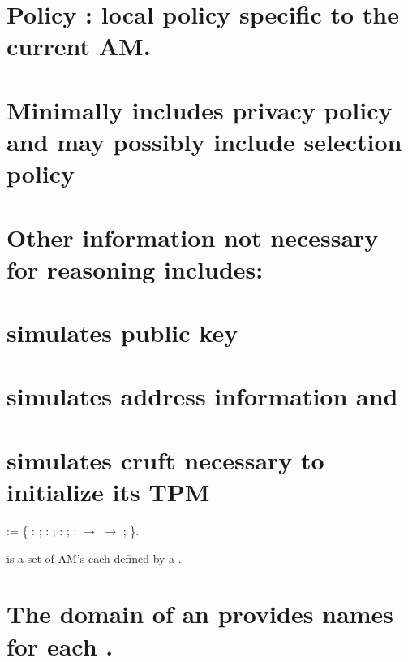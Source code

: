 \documentclass[12pt]{report}
\begin{document}
\section{Policy : local policy specific to the current AM.}


\section{Minimally includes privacy policy and may possibly include selection policy}




\section{Other information not necessary for reasoning includes:}


\section{\texorpdfstring{\protect}{key} simulates public key}


\section{\texorpdfstring{\protect}{address} simulates address information and}


\section{\texorpdfstring{\protect}{tpm} simulates cruft necessary to initialize its TPM}



\begin{coqdoccode}
\coqdocnoindent
{}  := \{\coqdoceol
\coqdocnoindent
\coqdoceol
\coqdocindent{1.50em}
 :   ;\coqdoceol
\coqdocindent{1.50em}
 :   ; \coqdoceol
\coqdocindent{1.50em}
 :   ; \coqdoceol
\coqdocindent{1.50em}
 :  \ensuremath{\rightarrow}  \ensuremath{\rightarrow}  ;\coqdoceol
\coqdocnoindent
\coqdoceol
\coqdocnoindent
\coqdoceol
\coqdocindent{0.50em}
\}.\coqdoceol
\coqdocemptyline
\end{coqdoccode}
 is a set of AM's each defined by a .
\section{The domain of an \texorpdfstring{\protect}{Environment} provides names for each \texorpdfstring{\protect}{Manifest}.}
\end{document}

